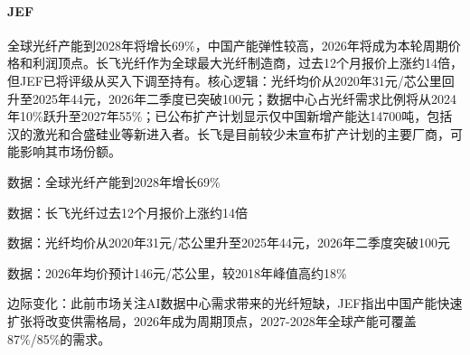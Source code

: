 \documentclass[11pt]{ctexart}
\begin{document}
\paragraph{JEF} 全球光纤产能到2028年将增长69\%，中国产能弹性较高，2026年将成为本轮周期价格和利润顶点。长飞光纤作为全球最大光纤制造商，过去12个月报价上涨约14倍，但JEF已将评级从买入下调至持有。核心逻辑：光纤均价从2020年31元/芯公里回升至2025年44元，2026年二季度已突破100元；数据中心占光纤需求比例将从2024年10\%跃升至2027年55\%；已公布扩产计划显示仅中国新增产能达14700吨，包括汉的激光和合盛硅业等新进入者。长飞是目前较少未宣布扩产计划的主要厂商，可能影响其市场份额。
{\small\color{refgray}数据：全球光纤产能到2028年增长69\%\par}
{\small\color{refgray}数据：长飞光纤过去12个月报价上涨约14倍\par}
{\small\color{refgray}数据：光纤均价从2020年31元/芯公里升至2025年44元，2026年二季度突破100元\par}
{\small\color{refgray}数据：2026年均价预计146元/芯公里，较2018年峰值高约18\%\par}
{\small\color{refgray}边际变化：此前市场关注AI数据中心需求带来的光纤短缺，JEF指出中国产能快速扩张将改变供需格局，2026年成为周期顶点，2027-2028年全球产能可覆盖87\%/85\%的需求。\par}
\end{document}
